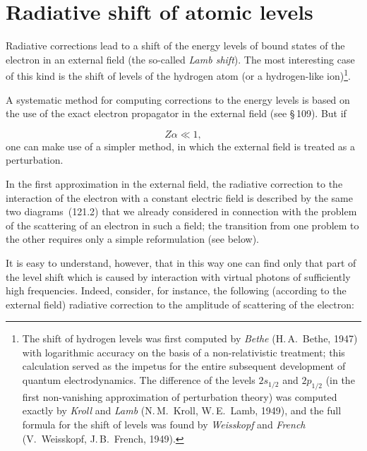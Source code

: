 
\section{Radiative shift of atomic levels}


Radiative corrections lead to a shift of the energy levels of bound states of the electron in an external field (the so-called \emph{Lamb shift}). The most interesting case of this kind is the shift of levels of the hydrogen atom (or a hydrogen-like ion)\footnote{The shift of hydrogen levels was first computed by \emph{Bethe} (H.\,A.~Bethe, 1947) with logarithmic accuracy on the basis of a non-relativistic treatment; this calculation served as the impetus for the entire subsequent development of quantum electrodynamics. The difference of the levels $2s_{1/2}$ and $2p_{1/2}$ (in the first non-vanishing approximation of perturbation theory) was computed exactly by \emph{Kroll} and \emph{Lamb} (N.\,M.~Kroll, W.\,E.~Lamb, 1949), and the full formula for the shift of levels was found by \emph{Weisskopf} and \emph{French} (V.~Weisskopf, J.\,B.~French, 1949).}.

A systematic method for computing corrections to the energy levels is based on the use of the exact electron propagator in the external field (see \S\,109). But if


\begin{equation}
Z\alpha \ll 1,
\label{eq:123.1}
\end{equation}
one can make use of a simpler method, in which the external field is treated as a perturbation.

In the first approximation in the external field, the radiative correction to the interaction of the electron with a constant electric field is described by the same two diagrams~(121.2) that we already considered in connection with the problem of the scattering of an electron in such a field; the transition from one problem to the other requires only a simple reformulation (see below).

It is easy to understand, however, that in this way one can find only that part of the level shift which is caused by interaction with virtual photons of sufficiently high frequencies. Indeed, consider, for instance, the following (according to the external field) radiative correction to the amplitude of scattering of the electron:


